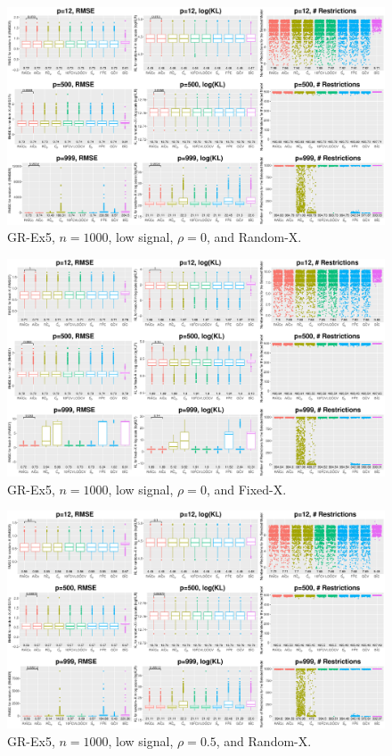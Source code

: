 \clearpage
\begin{figure}[!ht]
\centering
\includegraphics[width=\textwidth]{figures/supplement/randomx_GR-Ex5_n1000_lsnr_rho0.eps}
\caption{GR-Ex5, $n=1000$, low signal, $\rho=0$, and Random-X.}
\end{figure}
\begin{figure}[!ht]
\centering
\includegraphics[width=\textwidth]{figures/supplement/fixedx_GR-Ex5_n1000_lsnr_rho0.eps}
\caption{GR-Ex5, $n=1000$, low signal, $\rho=0$, and Fixed-X.}
\end{figure}
\clearpage
\begin{figure}[!ht]
\centering
\includegraphics[width=\textwidth]{figures/supplement/randomx_GR-Ex5_n1000_lsnr_rho05.eps}
\caption{GR-Ex5, $n=1000$, low signal, $\rho=0.5$, and Random-X.}
\end{figure}

